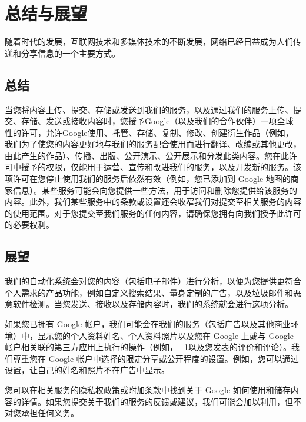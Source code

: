 \chapter{总结与展望}

随着时代的发展，互联网技术和多媒体技术的不断发展，网络已经日益成为人们传递和分享信息的一个主要方式。

\section{总结}

当您将内容上传、提交、存储或发送到我们的服务，以及通过我们的服务上传、提交、存储、发送或接收内容时，您授予Google（以及我们的合作伙伴）一项全球性的许可，允许Google使用、托管、存储、复制、修改、创建衍生作品（例如，我们为了使您的内容更好地与我们的服务配合使用而进行翻译、改编或其他更改，由此产生的作品）、传播、出版、公开演示、公开展示和分发此类内容。您在此许可中授予的权限，仅能用于运营、宣传和改进我们的服务，以及开发新的服务。该项许可在您停止使用我们的服务后依然有效（例如，您已添加到 Google 地图的商家信息）。某些服务可能会向您提供一些方法，用于访问和删除您提供给该服务的内容。此外，我们某些服务中的条款或设置还会收窄我们对提交至相关服务的内容的使用范围。对于您提交至我们服务的任何内容，请确保您拥有向我们授予此许可的必要权利。

\section{展望}

我们的自动化系统会对您的内容（包括电子邮件）进行分析，以便为您提供更符合个人需求的产品功能，例如自定义搜索结果、量身定制的广告，以及垃圾邮件和恶意软件检测。当您发送、接收以及存储内容时，我们的系统就会进行这项分析。

如果您已拥有 Google 帐户，我们可能会在我们的服务（包括广告以及其他商业环境）中，显示您的个人资料姓名、个人资料照片以及您在 Google 上或与 Google 帐户相关联的第三方应用上执行的操作（例如，+1以及您发表的评价和评论）。我们尊重您在 Google 帐户中选择的限定分享或公开程度的设置。例如，您可以通过设置，让自己的姓名和照片不在广告中显示。

您可以在相关服务的隐私权政策或附加条款中找到关于 Google 如何使用和储存内容的详情。如果您提交关于我们的服务的反馈或建议，我们可能会加以利用，但不对您承担任何义务。